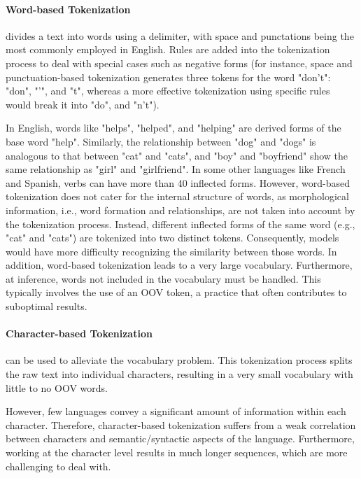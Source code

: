 \paragraph{Word-based Tokenization} divides a text into words using a delimiter, with space and punctations being the most commonly employed in English. Rules are added into the tokenization process to deal with special cases such as negative forms (for instance, space and punctuation-based tokenization generates three tokens for the word "don't":  "don", "'", and "t", whereas a more effective tokenization using specific rules would  break it into "do", and "n't").

In English, words like "helps", "helped", and "helping" are derived forms of the base word "help". Similarly, the relationship between "dog" and "dogs" is analogous to that between "cat" and "cats", and "boy" and "boyfriend" show the same relationship as "girl" and "girlfriend". In some other languages like French and Spanish, verbs can have more than 40 inflected forms. However, word-based tokenization does not cater for the internal structure of words, as morphological information, i.e., word formation and relationships, are not taken into account by the tokenization process. Instead, different inflected forms of the same word (e.g., "cat" and "cats") are tokenized into two distinct tokens. Consequently, models would have more difficulty recognizing the similarity between those words. In addition, word-based tokenization leads to a very large vocabulary. Furthermore, at inference, words not included in the vocabulary must be handled. This typically involves the use of an \ac{OOV} token, a practice that often contributes to suboptimal results.

\paragraph{Character-based Tokenization} \citep{wehrmann2017character} can be used to alleviate the vocabulary problem. This tokenization process splits the raw text into individual characters, resulting in a very small vocabulary with little to no \ac{OOV} words. 

However, few languages convey a significant amount of information within each character. Therefore, character-based tokenization suffers from a weak correlation between characters and semantic/syntactic aspects of the language. Furthermore, working at the character level results in much longer sequences, which are more challenging to deal with.

